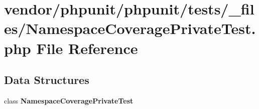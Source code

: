 \section{vendor/phpunit/phpunit/tests/\+\_\+files/\+Namespace\+Coverage\+Private\+Test.php File Reference}
\label{phpunit_2tests_2__files_2_namespace_coverage_private_test_8php}
\subsection*{Data Structures}
\begin{DoxyCompactItemize}
\item 
class {\bf Namespace\+Coverage\+Private\+Test}
\end{DoxyCompactItemize}
